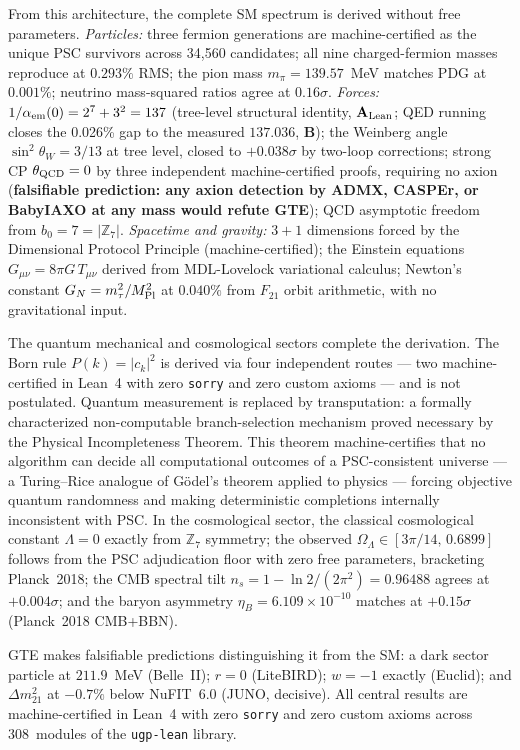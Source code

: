 \documentclass[11pt,openany]{book}
\theoremstyle{remark}
\newcommand{\CatAL}{\ensuremath{\textbf{A}_{\rm Lean}}}
\newcommand{\CatB}{\textbf{B}}
\begin{document}
From this architecture, the complete SM spectrum is derived without free parameters.
\textit{Particles:} three fermion generations are machine-certified as the unique PSC
survivors across 34,560 candidates; all nine charged-fermion masses reproduce at
$0.293\%$ RMS; the pion mass $m_\pi = 139.57$~MeV matches PDG at $0.001\%$;
neutrino mass-squared
ratios agree at $0.16\sigma$. \textit{Forces:} $1/\alpha_{\rm em}(0) = 2^7 + 3^2 =
137$ (tree-level structural identity, \CatAL; QED running closes the 0.026\% gap
to the measured $137.036$, \CatB); the Weinberg angle $\sin^2\theta_W = 3/13$ at
tree level, closed to $+0.038\sigma$ by two-loop corrections; strong CP
$\theta_{\rm QCD}=0$ by three independent machine-certified proofs, requiring no axion
(\textbf{falsifiable prediction: any axion detection by ADMX, CASPEr, or BabyIAXO
at any mass would refute GTE});
QCD asymptotic freedom from $b_0 = 7 = |\mathbb{Z}_7|$. \textit{Spacetime and
gravity:} $3{+}1$ dimensions forced by the Dimensional Protocol Principle
(machine-certified); the Einstein equations $G_{\mu\nu} = 8\pi G\,T_{\mu\nu}$ derived
from MDL-Lovelock variational calculus; Newton's constant $G_N = m_\tau^2/M_{\rm Pl}^2$
at $0.040\%$ from $F_{21}$ orbit arithmetic, with no gravitational input.

The quantum mechanical and cosmological sectors complete the derivation. The Born rule
$P(k) = |c_k|^2$ is derived via four independent routes --- two machine-certified in
Lean~4 with zero \texttt{sorry} and zero custom axioms --- and is not postulated.
Quantum measurement is replaced by transputation: a formally characterized non-computable
branch-selection mechanism proved necessary by the Physical Incompleteness Theorem.
This theorem machine-certifies that no algorithm can decide all computational outcomes
of a PSC-consistent universe --- a Turing--Rice analogue of G\"{o}del's theorem applied
to physics --- forcing objective quantum randomness and making deterministic completions
internally inconsistent with PSC. In the cosmological sector, the classical
cosmological constant $\Lambda=0$ exactly from $\mathbb{Z}_7$ symmetry; the observed
$\Omega_\Lambda \in [3\pi/14,\,0.6899]$ follows from the PSC adjudication floor with
zero free parameters, bracketing Planck~2018; the CMB spectral tilt $n_s = 1 -
\ln 2/(2\pi^2) = 0.96488$ agrees at $+0.004\sigma$; and the baryon asymmetry $\eta_B =
6.109\times10^{-10}$ matches at $+0.15\sigma$ (Planck~2018 CMB+BBN).

GTE makes falsifiable predictions distinguishing it from the SM: a dark sector particle
at $211.9$~MeV (Belle~II); $r=0$ (LiteBIRD); $w=-1$ exactly (Euclid); and
$\Delta m^2_{21}$ at $-0.7\%$ below NuFIT~6.0 (JUNO, decisive). All central results
are machine-certified in Lean~4 with zero \texttt{sorry} and zero custom axioms across
308~modules of the \texttt{ugp-lean} library.
\end{document}
